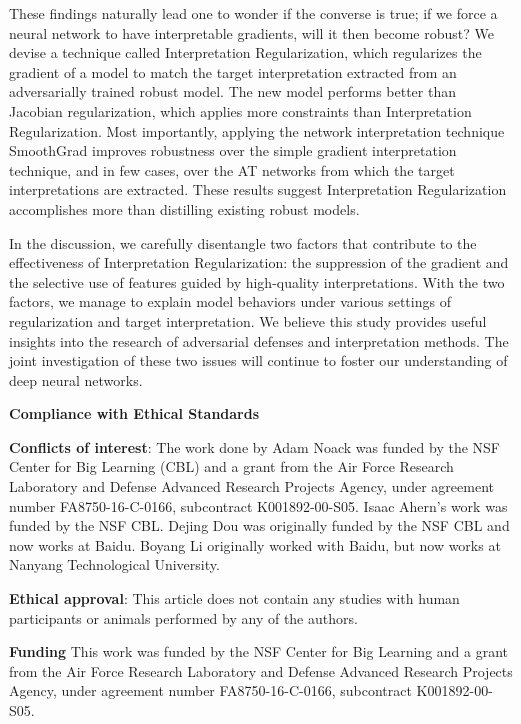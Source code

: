 These findings naturally lead one to wonder if the converse is true; if we force a neural network to have interpretable gradients, will it then become robust? We devise a technique called Interpretation Regularization, which regularizes the gradient of a model to match the target interpretation extracted from an adversarially trained robust model. The new model performs better than Jacobian regularization, which applies more constraints than Interpretation Regularization. Most importantly, applying the network interpretation technique SmoothGrad \cite{smoothgrad} improves robustness over the simple gradient interpretation technique, and in few cases, over the AT networks from which the target interpretations are extracted. These results suggest Interpretation Regularization accomplishes more than distilling existing robust models. 

In the discussion, we carefully disentangle two factors that contribute to the effectiveness of Interpretation Regularization: the suppression of the gradient and the selective use of features guided by high-quality interpretations. With the two factors, we manage to explain model behaviors under various settings of regularization and target interpretation. We believe this study provides useful insights into the research of adversarial defenses and interpretation methods. The joint investigation of these two issues will continue to foster our understanding of deep neural networks. 

\vspace{.2cm}
\noindent \textbf{Compliance with Ethical Standards} 

\textbf{Conflicts of interest}: The work done by Adam Noack was funded by the NSF Center for Big Learning (CBL) and a grant from the Air Force Research Laboratory and Defense Advanced Research Projects Agency, under agreement number FA8750-16-C-0166, subcontract K001892-00-S05. Isaac Ahern's work was funded by the NSF CBL. Dejing Dou was originally funded by the NSF CBL and now works at Baidu. Boyang Li originally worked with Baidu, but now works at Nanyang Technological University. 

\textbf{Ethical approval}: This article does not contain any studies with human participants or animals performed by any of the authors.

\vspace{.2cm}
\noindent \textbf{Funding} This work was funded by the NSF Center for Big Learning and a grant from the Air Force Research Laboratory and Defense Advanced Research Projects Agency, under agreement number FA8750-16-C-0166, subcontract K001892-00-S05.

